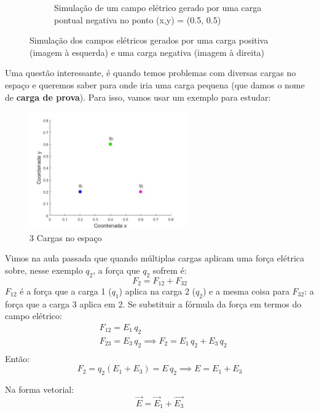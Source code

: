 \documentclass[12pt]{extarticle}
\newcommand{\<}{\langle}
\renewcommand{\>}{\rangle}
\theoremstyle{definition}
\begin{document}
\begin{figure}[H]
\begin{subfigure}[b]{0.45\textwidth}
         \caption{Simulação de um campo elétrico gerado por uma carga pontual negativa no ponto (x,y) = (0.5, 0.5)}
         \label{fig:field_-}
     \end{subfigure}
        \caption{Simulação dos campos elétricos gerados por uma carga positiva (imagem à esquerda) e uma carga negativa (imagem à direita)}
        \label{fig:electric_field}
\end{figure}

Uma questão interessante, é quando temos problemas com diversas cargas no espaço e queremos saber para onde iria uma carga pequena (que damos o nome de \textbf{carga de prova}). Para isso, vamos usar um exemplo para estudar:

\begin{figure}[H]
    \centering
    \includegraphics[width=0.6\textwidth]{ex_1.jpg}
    \caption{3 Cargas no espaço}
    \label{fig:ex_1}
\end{figure}

Vimos na aula passada que quando múltiplas cargas aplicam uma força elétrica sobre, nesse exemplo $q_2$, a força que $q_2$ sofrem é:
\begin{equation}
    F_2 = F_{12} + F_{32}
\end{equation}
\noindent $F_{12}$ é a força que a carga 1 ($q_1$) aplica na carga 2 ($q_2$) e a mesma coisa para $F_{32}$: a força que a carga 3 aplica em 2. Se substituir a fórmula da força em termos do campo elétrico:
\begin{align*}
    &F_{12} = E_1\,q_2\\
    &F_{23} = E_3\,q_2
    \implies F_2 = E_1\,q_2 + E_3\,q_2\\
\end{align*}
Então:
\begin{equation}
    F_2 = q_2\left(E_1 + E_3 \right) = E\,q_2 \implies E = E_1 + E_3
\end{equation}

Na forma vetorial: 
\begin{equation}
    \vec{E} = \vec{E}_1 + \vec{E_3}
\end{equation}
\end{document}
